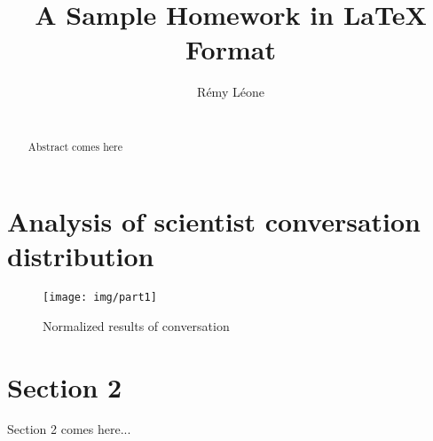 \documentclass{sig-alternate-10pt}
\begin{document}
\title{A Sample Homework in LaTeX Format}


\author{
\alignauthor
Rémy Léone\\
       \\
}

\maketitle

\begin{abstract}
Abstract comes here
\end{abstract}


\section{Analysis of scientist conversation distribution}

\begin{figure}[h]
\begin{center}
\texttt{[image: img/part1]}
\end{center}
\caption{Normalized results of conversation}
\end{figure}


\section{Section 2}

\cite{overcite} Section 2 comes here...



\end{document}
